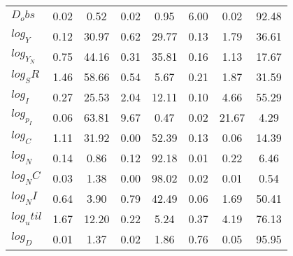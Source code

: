 \begin{center}
\begin{longtable}{lccccccc}
$D_obs     $	 & 	        0.02	 & 	        0.52	 & 	        0.02	 & 	        0.95	 & 	        6.00	 & 	        0.02	 & 	       92.48 \\ 
$log_Y     $	 & 	        0.12	 & 	       30.97	 & 	        0.62	 & 	       29.77	 & 	        0.13	 & 	        1.79	 & 	       36.61 \\ 
$log_Y_N   $	 & 	        0.75	 & 	       44.16	 & 	        0.31	 & 	       35.81	 & 	        0.16	 & 	        1.13	 & 	       17.67 \\ 
$log_SR    $	 & 	        1.46	 & 	       58.66	 & 	        0.54	 & 	        5.67	 & 	        0.21	 & 	        1.87	 & 	       31.59 \\ 
$log_I     $	 & 	        0.27	 & 	       25.53	 & 	        2.04	 & 	       12.11	 & 	        0.10	 & 	        4.66	 & 	       55.29 \\ 
$log_p_I   $	 & 	        0.06	 & 	       63.81	 & 	        9.67	 & 	        0.47	 & 	        0.02	 & 	       21.67	 & 	        4.29 \\ 
$log_C     $	 & 	        1.11	 & 	       31.92	 & 	        0.00	 & 	       52.39	 & 	        0.13	 & 	        0.06	 & 	       14.39 \\ 
$log_N     $	 & 	        0.14	 & 	        0.86	 & 	        0.12	 & 	       92.18	 & 	        0.01	 & 	        0.22	 & 	        6.46 \\ 
$log_NC    $	 & 	        0.03	 & 	        1.38	 & 	        0.00	 & 	       98.02	 & 	        0.02	 & 	        0.01	 & 	        0.54 \\ 
$log_NI    $	 & 	        0.64	 & 	        3.90	 & 	        0.79	 & 	       42.49	 & 	        0.06	 & 	        1.69	 & 	       50.41 \\ 
$log_util  $	 & 	        1.67	 & 	       12.20	 & 	        0.22	 & 	        5.24	 & 	        0.37	 & 	        4.19	 & 	       76.13 \\ 
$log_D     $	 & 	        0.01	 & 	        1.37	 & 	        0.02	 & 	        1.86	 & 	        0.76	 & 	        0.05	 & 	       95.95 \\ 
\end{longtable}
 \end{center}
